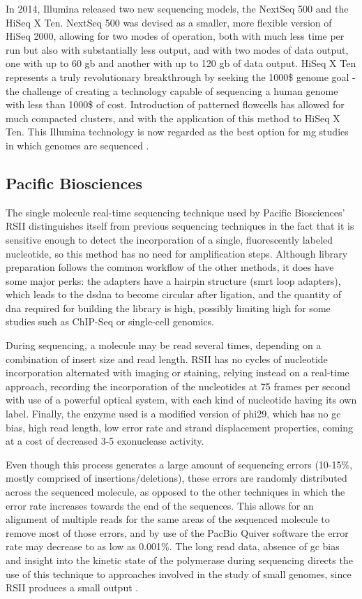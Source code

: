 \documentclass[
  oneside,
  11pt, a4paper,
  footinclude=true,
  headinclude=true,
  cleardoublepage=empty
]{scrbook}
\begin{document}
    In 2014, Illumina released two new sequencing models, the NextSeq 500 and the HiSeq X Ten. NextSeq 500 was devised as a smaller, more flexible version of HiSeq 2000, allowing for two modes of operation, both with much less time per run but also with substantially less output, and with two modes of data output, one with up to 60 \gls{gb} and another with up to 120 \gls{gb} of data output. HiSeq X Ten represents a truly revolutionary breakthrough by seeking the 1000\$ genome goal - the challenge of creating a technology capable of sequencing a human genome with less than 1000\$ of cost. Introduction of patterned flowcells has allowed for much compacted clusters, and with the application of this method to HiSeq X Ten. This Illumina technology is now regarded as the best option for \gls{mg} studies in which genomes are sequenced \citep{Illumina2015}.
    
    \subsection{Pacific Biosciences}
    
    The single molecule real-time sequencing technique used by Pacific Biosciences' RSII distinguishes itself from previous sequencing techniques in the fact that it is sensitive enough to detect the incorporation of a single, fluorescently labeled nucleotide, so this method has no need for amplification steps. Although library preparation follows the common workflow of the other methods, it does have some major perks: the adapters have a hairpin structure (\gls{smrt} loop adapters), which leads to the \gls{dsdna} to become circular after ligation, and the quantity of \gls{dna} required for building the library is high, possibly limiting high for some studies such as ChIP-Seq or single-cell genomics. 
    
    During sequencing, a molecule may be read several times, depending on a combination of insert size and read length. RSII has no cycles of nucleotide incorporation alternated with imaging or staining, relying instead on a real-time approach, recording the incorporation of the nucleotides at 75 frames per second with use of a powerful optical system, with each kind of nucleotide having its own label. Finally, the enzyme used is a modified version of phi29, which has no \gls{gc} bias, high read length, low error rate and strand displacement properties, coming at a cost of decreased 3-5 exonuclease activity.
    
    Even though this process generates a large amount of sequencing errors (10-15\%, mostly comprised of insertions/deletions), these errors are randomly distributed across the sequenced molecule, as opposed to the other techniques in which the error rate increases towards the end of the sequences. This allows for an alignment of multiple reads for the same areas of the sequenced molecule to remove most of those errors, and by use of the PacBio Quiver software the error rate may decrease to as low as 0.001\%. The long read data, absence of \gls{gc} bias and insight into the kinetic state of the polymerase during sequencing directs the use of this technique to approaches involved in the study of small genomes, since RSII produces a small output \citep{Buermans2014}.
    
\end{document}
